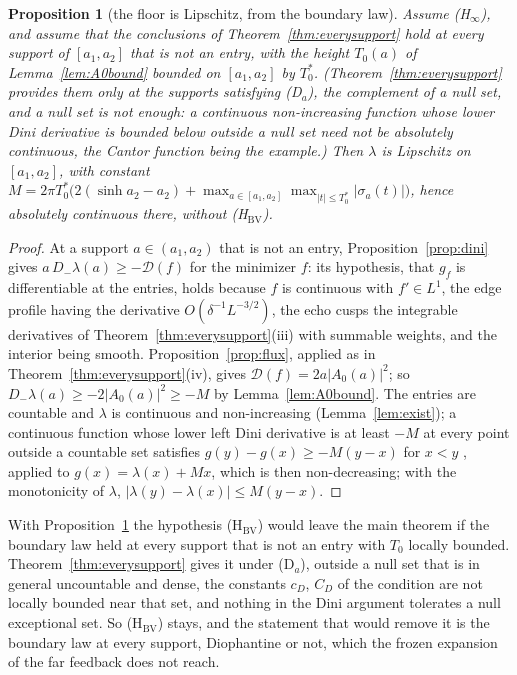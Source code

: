 \documentclass[11pt]{article}
\newtheorem{proposition}[theorem]{Proposition}
\theoremstyle{definition}
\theoremstyle{remark}
\newcommand{\Dm}{D_{-}}
\begin{document}
\begin{proposition}[the floor is Lipschitz, from the boundary law]\label{prop:lipschitz}
Assume (H$_\infty$), and assume that the conclusions of Theorem~\ref{thm:everysupport} hold at every support of $[a_1,a_2]$ that is not an entry, with the height $T_0(a)$ of Lemma~\ref{lem:A0bound} bounded on $[a_1,a_2]$ by $T_0^*$. (Theorem~\ref{thm:everysupport} provides them only at the supports satisfying (D$_a$), the complement of a null set, and a null set is not enough: a continuous non-increasing function whose lower Dini derivative is bounded below outside a null set need not be absolutely continuous, the Cantor function being the example.) Then $\lambda$ is Lipschitz on $[a_1,a_2]$, with constant $M=2\pi T_0^*\big(2(\sinh a_2-a_2)+\max_{a\in[a_1,a_2]}\max_{|t|\le T_0^*}|\sigma_a(t)|\big)$, hence absolutely continuous there, without (H$_{\mathrm{BV}}$).
\end{proposition}
\begin{proof}
At a support $a\in(a_1,a_2)$ that is not an entry, Proposition~\ref{prop:dini} gives $a\,\Dm\lambda(a)\ge-\mathcal D(f)$ for the minimizer $f$: its hypothesis, that $g_f$ is differentiable at the entries, holds because $f$ is continuous with $f'\in L^1$, the edge profile having the derivative $O(\delta^{-1}L^{-3/2})$, the echo cusps the integrable derivatives of Theorem~\ref{thm:everysupport}(iii) with summable weights, and the interior being smooth. Proposition~\ref{prop:flux}, applied as in Theorem~\ref{thm:everysupport}(iv), gives $\mathcal D(f)=2a|A_0(a)|^2$; so $\Dm\lambda(a)\ge-2|A_0(a)|^2\ge-M$ by Lemma~\ref{lem:A0bound}. The entries are countable and $\lambda$ is continuous and non-increasing (Lemma~\ref{lem:exist}); a continuous function whose lower left Dini derivative is at least $-M$ at every point outside a countable set satisfies $g(y)-g(x)\ge-M(y-x)$ for $x<y$ \cite[Ch.~VI, \S4]{saks}, applied to $g(x)=\lambda(x)+Mx$, which is then non-decreasing; with the monotonicity of $\lambda$, $|\lambda(y)-\lambda(x)|\le M(y-x)$.
\end{proof}

With Proposition~\ref{prop:lipschitz} the hypothesis (H$_{\mathrm{BV}}$) would leave the main theorem if the boundary law held at every support that is not an entry with $T_0$ locally bounded. Theorem~\ref{thm:everysupport} gives it under (D$_a$), outside a null set that is in general uncountable and dense, the constants $c_D$, $C_D$ of the condition are not locally bounded near that set, and nothing in the Dini argument tolerates a null exceptional set. So (H$_{\mathrm{BV}}$) stays, and the statement that would remove it is the boundary law at every support, Diophantine or not, which the frozen expansion of the far feedback does not reach.
\end{document}
